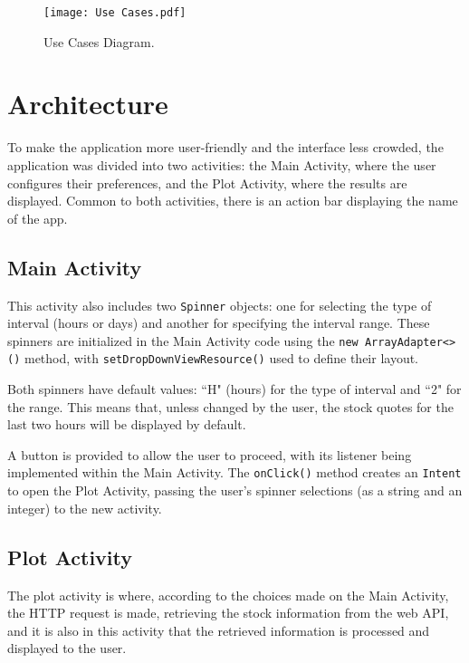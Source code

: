 \documentclass{article}
\begin{document}
\begin{figure}[ht]
    \centering
    \texttt{[image: Use Cases.pdf]}
    \caption{Use Cases Diagram.}
    \label{fig:UseCases}
\end{figure}



\section{Architecture}
To make the application more user-friendly and the interface less crowded, the application was divided into two activities: the Main Activity, where the user configures their preferences, and the Plot Activity, where the results are displayed.
Common to both activities, there is an action bar displaying the name of the app. 

\subsection{Main Activity}
\label{sec:Main Activity Java}
This activity also includes two \texttt{Spinner} objects: one for selecting the type of interval (hours or days) and another for specifying the interval range. 
These spinners are initialized in the Main Activity code using the \texttt{new ArrayAdapter<>()} method, with \texttt{setDropDownViewResource()} used to define their layout.

Both spinners have default values: ``H" (hours) for the type of interval and ``2" for the range. 
This means that, unless changed by the user, the stock quotes for the last two hours will be displayed by default.

A button is provided to allow the user to proceed, with its listener being implemented within the Main Activity. The \texttt{onClick()} method creates an \texttt{Intent} to open the Plot Activity, passing the user's spinner selections (as a string and an integer) to the new activity.


\subsection{Plot Activity}
The plot activity is where, according to the choices made on the Main Activity, the HTTP request is made, retrieving the stock information from the web API, and it is also in this activity that the retrieved information is processed and displayed to the user.
\end{document}
